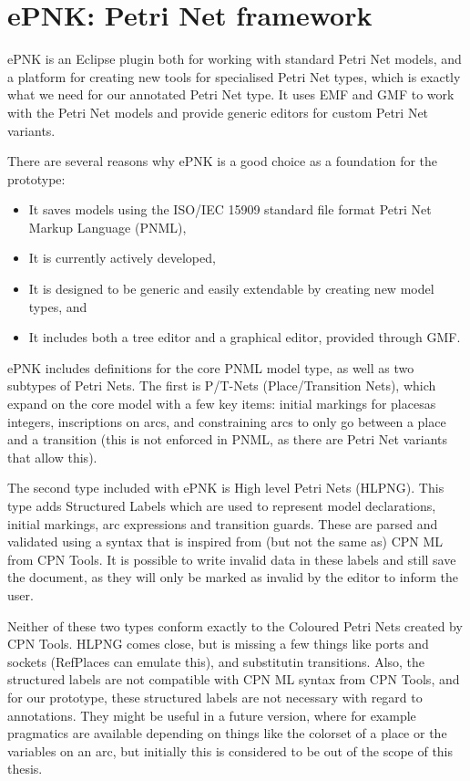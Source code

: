 \section{ePNK: Petri Net framework}
\label{sec:epnk}
ePNK is an Eclipse plugin both for working with standard Petri Net models, and a
platform for creating new tools for specialised Petri Net types, which is
exactly what we need for our annotated Petri Net type. It uses EMF and GMF to
work with the Petri Net models and provide generic editors for custom Petri Net variants.

There are several reasons why ePNK is a good choice as a foundation for the
prototype:
\begin{itemize}
	\item It saves models using the ISO/IEC 15909 \cite{ISO-15909-2} standard file
	format Petri Net Markup Language (PNML),
	\item It is currently actively developed,
	\item It is designed to be generic and easily extendable by creating new model
	types, and
	\item It includes both a tree editor and a graphical editor, provided through
	GMF.
\end{itemize}

ePNK includes definitions for the core PNML model type, as well as two
subtypes of Petri Nets. The first is P/T-Nets (Place/Transition Nets), which
expand on the core model with a few key items: initial markings for placesas
integers, inscriptions on arcs, and constraining arcs to only go between a place
and a transition (this is not enforced in PNML, as there are Petri Net variants that
allow this). 

The second type included with ePNK is High level Petri Nets (HLPNG). This type
adds Structured Labels which are used to represent model declarations, initial
markings, arc expressions and transition guards.
These are parsed and validated using a syntax that is inspired from (but not the
same as) CPN ML from CPN Tools. It is possible to write invalid data in these
labels and still save the document, as they will only be marked as invalid by
the editor to inform the user.

Neither of these two types conform exactly to the Coloured Petri Nets created by
CPN Tools. HLPNG comes close, but is missing a few things like ports and sockets
(RefPlaces can emulate this), and substitutin transitions. Also, the
structured labels are not compatible with CPN ML syntax from CPN Tools, and for
our prototype, these structured labels are not necessary with regard to
annotations. They might be useful in a future version, where for example
pragmatics are available depending on things like the colorset of a place or the
variables on an arc, but initially this is considered to be out of the scope of
this thesis.

